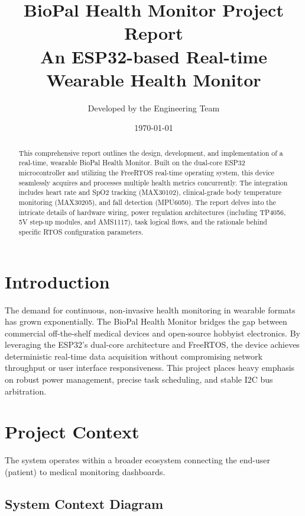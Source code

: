 \documentclass[12pt,a4paper]{report}
\title{
    \vspace{2cm}
    \textbf{\Huge BioPal Health Monitor Project Report}\\
    \vspace{1cm}
    \large \textbf{An ESP32-based Real-time Wearable Health Monitor}\\
    \vspace{2cm}
}
\author{Developed by the Engineering Team}
\date{\today}
\begin{document}
\maketitle

\begin{abstract}
This comprehensive report outlines the design, development, and implementation of a real-time, wearable BioPal Health Monitor. Built on the dual-core ESP32 microcontroller and utilizing the FreeRTOS real-time operating system, this device seamlessly acquires and processes multiple health metrics concurrently. The integration includes heart rate and SpO2 tracking (MAX30102), clinical-grade body temperature monitoring (MAX30205), and fall detection (MPU6050). The report delves into the intricate details of hardware wiring, power regulation architectures (including TP4056, 5V step-up modules, and AMS1117), task logical flows, and the rationale behind specific RTOS configuration parameters.
\end{abstract}

\tableofcontents
\newpage

\chapter{Introduction}
The demand for continuous, non-invasive health monitoring in wearable formats has grown exponentially. The BioPal Health Monitor bridges the gap between commercial off-the-shelf medical devices and open-source hobbyist electronics. By leveraging the ESP32's dual-core architecture and FreeRTOS, the device achieves deterministic real-time data acquisition without compromising network throughput or user interface responsiveness. This project places heavy emphasis on robust power management, precise task scheduling, and stable I2C bus arbitration.

\chapter{Project Context}
The system operates within a broader ecosystem connecting the end-user (patient) to medical monitoring dashboards.
\section{System Context Diagram}
\end{document}

